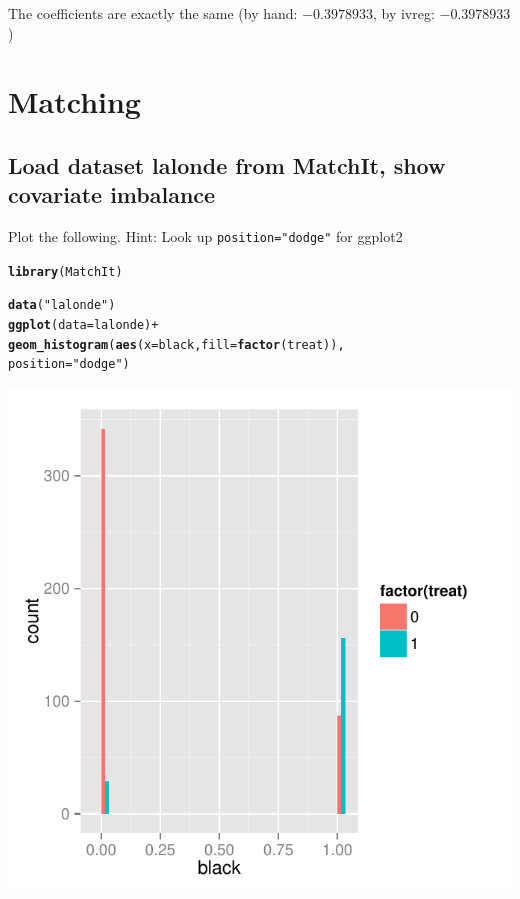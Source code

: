 \documentclass{article}\usepackage[]{graphicx}\usepackage[]{color}
\makeatletter
\def\maxwidth{ %
  \ifdim\Gin@nat@width>\linewidth
    \linewidth
  \else
    \Gin@nat@width
  \fi
}
\newcommand{\hlstr}[1]{\textcolor[rgb]{0.192,0.494,0.8}{#1}}%
\newcommand{\hlopt}[1]{\textcolor[rgb]{0,0,0}{#1}}%
\newcommand{\hlstd}[1]{\textcolor[rgb]{0.345,0.345,0.345}{#1}}%
\newcommand{\hlkwc}[1]{\textcolor[rgb]{0.333,0.667,0.333}{#1}}%
\newcommand{\hlkwd}[1]{\textcolor[rgb]{0.737,0.353,0.396}{\textbf{#1}}}%
\newenvironment{kframe}{%
 \def\at@end@of@kframe{}%
 \ifinner\ifhmode%
  \def\at@end@of@kframe{\end{minipage}}%
  \begin{minipage}{\columnwidth}%
 \fi\fi%
 \def\FrameCommand##1{\hskip\@totalleftmargin \hskip-\fboxsep
 \colorbox{shadecolor}{##1}\hskip-\fboxsep
     \hskip-\linewidth \hskip-\@totalleftmargin \hskip\columnwidth}%
 \MakeFramed {\advance\hsize-\width
   \@totalleftmargin\z@ \linewidth\hsize
   \@setminipage}}%
 {\par\unskip\endMakeFramed%
 \at@end@of@kframe}
\newenvironment{knitrout}{}{} %
\makeatother
\begin{document}
The coefficients are exactly the same (by hand: \ensuremath{-0.3978933}, by ivreg: \ensuremath{-0.3978933})

\section{Matching}

\subsection{Load dataset lalonde from MatchIt, show covariate imbalance}

Plot the following. Hint: Look up \verb|position="dodge"| for ggplot2

\begin{knitrout}
\color{fgcolor}\begin{kframe}
\begin{alltt}
\hlkwd{library}\hlstd{(MatchIt)}
\end{alltt}


{\ttfamily\noindent\itshape\color{messagecolor}{\#\# Loading required package: MASS}}\begin{alltt}
\hlkwd{data}\hlstd{(}\hlstr{"lalonde"}\hlstd{)}
\hlkwd{ggplot}\hlstd{(}\hlkwc{data} \hlstd{= lalonde)} \hlopt{+}
  \hlkwd{geom_histogram}\hlstd{(}\hlkwd{aes}\hlstd{(}\hlkwc{x} \hlstd{= black,} \hlkwc{fill} \hlstd{=} \hlkwd{factor}\hlstd{(treat)),}
                 \hlkwc{position} \hlstd{=} \hlstr{"dodge"}\hlstd{)}
\end{alltt}


{\ttfamily\noindent\itshape\color{messagecolor}{\#\# stat\_bin: binwidth defaulted to range/30. Use 'binwidth = x' to adjust this.}}\end{kframe}
\includegraphics[width=\maxwidth]{figure/unnamed-chunk-7-1} 

\end{knitrout}
\end{document}
